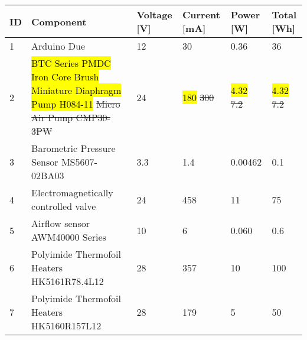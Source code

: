 \begin{longtable}{|m{}| m{} |m{} |m{}|m{}| m{} |}
\hline
\textbf{ID}             & \textbf{Component}                                                   & \textbf{Voltage {[}V{]}} & \textbf{Current {[}mA{]}} & \textbf{Power {[}W{]}} & \textbf{Total {[}Wh{]}} \\ \hline
1                       & Arduino Due                                       & 12                                          & 30                                           & 0.36                                      & 36                                         \\ \hline
2                       & \hl{BTC Series PMDC Iron Core Brush Miniature Diaphragm Pump H084-11} \st{Micro Air Pump CMP30-3PW}                          & 24                                          & \hl{180} \st{300}                                          &\hl{4.32} \st{7.2}                                       & \hl{4.32} \st{7.2}                                        \\ \hline
3                       & Barometric Pressure Sensor MS5607-02BA03          & 3.3                                         & 1.4                                          & 0.00462                                   & 0.1                                        \\ \hline
4                       & Electromagnetically controlled valve              & 24                                          & 458                                          & 11                                        & 75                                         \\ \hline
5                       & Airflow sensor AWM40000 Series                    & 10                                          & 6                                            & 0.060                                     & 0.6                                        \\ \hline
6                       & Polyimide Thermofoil Heaters HK5161R78.4L12       & 28                                          & 357                                          & 10                                        & 100                                        \\ \hline
7                       & Polyimide Thermofoil Heaters HK5160R157L12        & 28                                          & 179                                          & 5                                         & 50                                         \\ \hline

\end{longtable}
